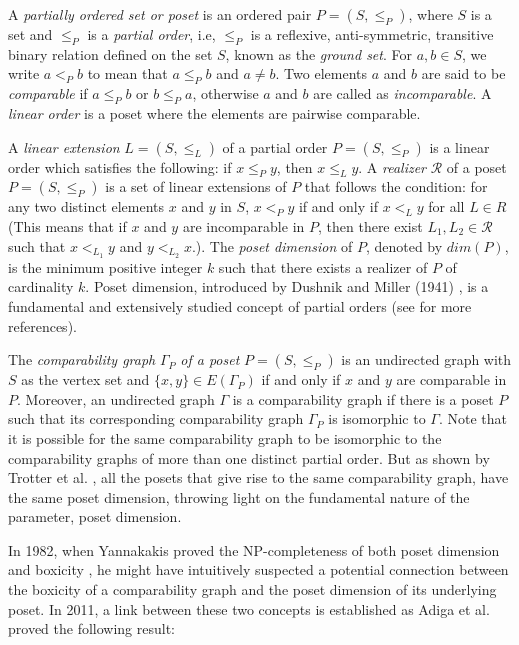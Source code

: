 \documentclass[twoside, 11pt]{article}
\newcommand{\G}{\Gamma}
\begin{document}
A \textit{partially ordered set or poset} is an ordered pair $P=(S,\leq_P)$, where $S$ is a set and $\leq_P$ is a \textit{partial order}, i.e, $\leq_P$ is a reflexive, anti-symmetric, transitive binary relation defined on the set $S$, known as the \textit{ground set}. For $a,b \in S$, we write $a < _P b$
to mean that $a \leq_P b$ and $a \neq b$. Two elements $a$ and $b$ are said to be \textit{comparable} if $a \leq_P b$ or $b\leq_P a$, otherwise $a$ and $b$ are called as \textit{incomparable}. A \textit{linear order} is a poset where the elements are pairwise comparable. 

A \textit{linear extension} $L=(S,\leq_L)$ of a partial order $P=(S,\leq_P)$ is a linear order which satisfies the following: if $x \leq_P y$, then $x \leq_L y$. A \textit{realizer} $\mathcal{R}$ of a poset $P = (S, \leq_P)$ is a set of linear
extensions of $P$ that follows the condition: for any two distinct elements $x$ and $y$ in $S$, $x <_P y$ if and only if $x <_L y$  for all $L \in R$ (This means that if $x$ and $y$ are incomparable in $P$, then there exist $L_1,L_2 \in  \mathcal {R} $ such that $x <_{L_1} y$  and $y <_{L_2} x$.). The \textit{poset dimension}
of $P$, denoted by $dim(P)$, is the minimum positive
integer $k$ such that there exists a realizer of $P$ of cardinality $k$. Poset dimension, introduced by Dushnik and Miller (1941) \cite{dushnik1941partially}, is a fundamental and extensively studied concept of partial orders (see \cite{trotter1992combinatorics, trotter1995partially} for more references).


The \textit{comparability graph} $\G_P$ \textit{of a poset} $P=(S,\leq_P)$ is an undirected graph with $S$ as the vertex set and $\{x,y\} \in E(\G_P)$ if and only if $x$ and $y$ are comparable in $P$. Moreover, an undirected graph $\G$ is a comparability graph if there is a poset $P$ such that its corresponding comparability graph $\G_P$ is isomorphic to $\G$. Note that it is possible for the same comparability graph to be isomorphic to the comparability graphs of more than one distinct partial order.  But as shown by Trotter et al. \cite{trotter1976dimension}, all 
the posets that give rise to the same comparability graph, have the same poset dimension, throwing light on the fundamental nature of the parameter, poset dimension.
 

 In 1982, when Yannakakis proved the NP-completeness of both poset dimension and boxicity \cite{yannakakis1982complexity}, he might have intuitively suspected a potential connection between the boxicity of a comparability graph and the poset dimension of its underlying poset.
 In 2011, a link between these two concepts is established as Adiga et al. \cite{adiga2011boxicity} proved the following result:
\end{document}
